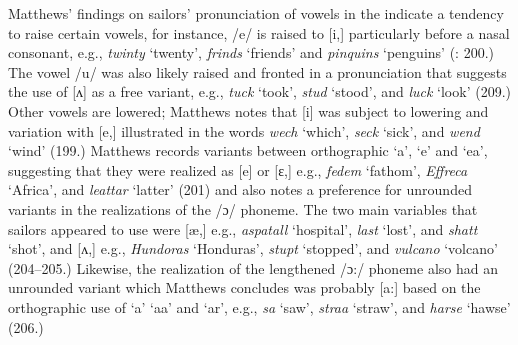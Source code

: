 Matthews’ findings on sailors’ pronunciation of vowels in the  indicate a tendency to raise certain vowels, for instance, /e/ is raised to [i,] particularly before a nasal consonant, e.g., \textit{twinty} ‘twenty’, \textit{frinds} ‘friends’ and \textit{pinquins} ‘penguins’ (\citealt{Matthews1935}: 200.) The vowel /u/ was also likely raised and fronted in a pronunciation that suggests the use of [ʌ] as a free variant, e.g., \textit{tuck} ‘took’, \textit{stud} ‘stood’, and \textit{luck} ‘look’ (209.) Other vowels are lowered; Matthews notes that [i] was subject to lowering and variation with [e,] illustrated in the words \textit{wech} ‘which’, \textit{seck} ‘sick’, and \textit{wend} ‘wind’ (199.) Matthews records variants between orthographic ‘a’, ‘e’ and ‘ea’, suggesting that they were realized as [e] or [ɛ,] e.g., \textit{fedem} ‘fathom’, \textit{Effreca} ‘Africa’, and \textit{leattar} ‘latter’ (201) and also notes a preference for unrounded variants in the realizations of the /ɔ/ phoneme. The two main variables that sailors appeared to use were [æ,] e.g., \textit{aspatall} ‘hospital’, \textit{last} ‘lost’, and \textit{shatt} ‘shot’, and [ʌ,] e.g., \textit{Hundoras} ‘Honduras’, \textit{stupt} ‘stopped’, and \textit{vulcano} ‘volcano’ (204--205.) Likewise, the realization of the lengthened /ɔ:/ phoneme also had an unrounded variant which Matthews concludes was probably [a:] based on the orthographic use of ‘a’ ‘aa’ and ‘ar’, e.g., \textit{sa} ‘saw’, \textit{straa} ‘straw’, and \textit{harse} ‘hawse’ (206.) 

